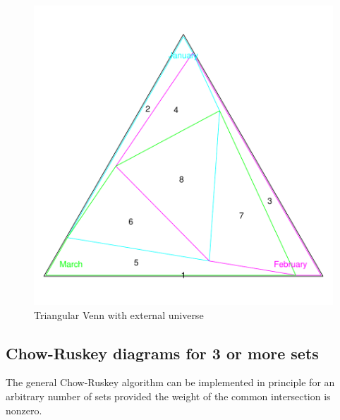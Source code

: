 \documentclass[a4paper]{article}
\begin{document}
\begin{figure}[H]\begin{center}
\includegraphics{Vennfig-plotT3}
\caption{Triangular Venn with external universe}
\end{center}
\end{figure}

\newpage

\subsection{Chow-Ruskey diagrams for 3 or more sets}
The general Chow-Ruskey algorithm  \cite{chowruskey:2005} can be implemented
in principle for an arbitrary number of sets provided
the weight of the common intersection is nonzero.
\end{document}
